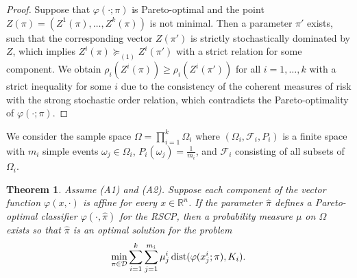 \documentclass[10pt,letterpaper]{article}
\newcommand{\R}{\mathbb{R}}
\newcommand{\Dc}{\mathcal{D}}
\newcommand{\Fc}{\mathcal{F}}
\newcommand{\Xc}{\mathcal{X}}
\newcommand{\Yc}{\mathcal{Y}}
\newcommand{\1}{1{\hskip -2.55 pt}\hbox{I}}
\newcommand{\fsd}{\succeq_{(1)}}
\newcommand{\dist}{\mathop{\rm dist}}
\newtheorem{theorem}{Theorem}
\newtheorem{proof}{Proof}
\begin{document}
\begin{proof}
Suppose that $\varphi(\cdot;\pi)$ is Pareto-optimal and the point \\
$Z(\pi) =(Z^1(\pi),\dots, Z^k(\pi))$ is not minimal. Then a parameter $\pi'$ exists, such that the corresponding vector $Z(\pi')$ is strictly stochastically dominated by  $Z$, which implies $Z^i(\pi) \fsd Z^i(\pi') $ with a strict relation for some component. We obtain
$\rho_i(Z^i(\pi)) \geq \rho_i(Z^i(\pi'))$ for all $i=1,\dots, k$ with a strict inequality for some $i$ due to the consistency of the coherent measures of risk with the strong stochastic order relation, which contradicts the Pareto-optimality of $\varphi(\cdot;\pi)$.
\end{proof}
We consider the sample space $\varOmega=\prod_{i=1}^k \varOmega_i$ where $(\varOmega_i,\Fc_i,P_i)$ is a finite space with $m_i$ simple events $\omega_j\in\varOmega_i$, $P_i(\omega_j)=\frac{1}{m_i}$, and $\Fc_i$ consisting of all subsets of $\varOmega_i$.
\begin{theorem}
\label{t:conditions}
Assume (A1) and (A2). Suppose each component of the vector function $\varphi(x,\cdot)$ is affine for every $x\in\R^n$.
If the parameter $\hat{\pi}$  defines a Pareto-optimal classifier $\varphi(\cdot, \hat{\pi})$ for the RSCP, then a probability measure $\mu$ on $\varOmega$ exists so that $\hat{\pi}$ is an optimal solution for the problem
\begin{equation}
\label{p:risk-neutral}
\min_{\pi\in\Dc} \sum_{i=1}^k \sum_{j=1}^{m_i} \mu^i_j \dist(\varphi(x^i_j;\pi),K_i).
\end{equation}
\end{theorem}
\end{document}
